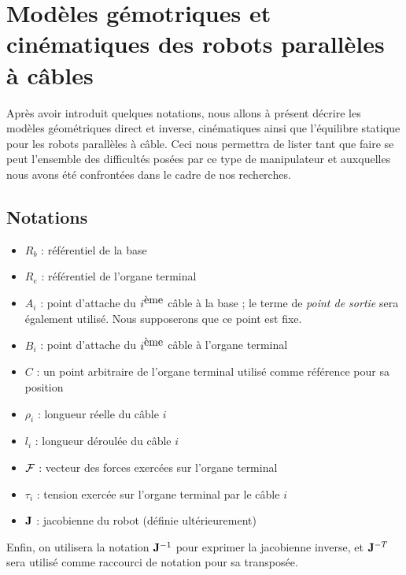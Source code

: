 \section{Mod\`eles g\'emotriques et cin\'ematiques des robots parall\`eles \`a 
c\^ables}

Après avoir introduit quelques notations, nous allons à présent décrire les 
modèles géométriques direct et inverse, cinématiques ainsi que l'équilibre 
statique pour les robots parallèles à câble. Ceci nous permettra de lister tant 
que faire se peut l'ensemble des difficultés posées par ce type de manipulateur 
et auxquelles nous avons été confrontées dans le cadre de nos recherches.

\subsection{Notations} \label{chap0-1-0}

\begin{figure}[!ht]
\centering
\def\svgwidth{.85\linewidth}

\end{figure}

\begin{itemize}
 \item $R_b$ : référentiel de la base
 \item $R_e$ : référentiel de l'organe terminal
 \item $A_i$ : point d'attache du $i^{\hbox{ème}}$ câble à la base ; le terme 
de {\it point de sortie} sera également utilisé. Nous supposerons que ce point 
est fixe.
 \item $B_i$ : point d'attache du $i^{\hbox{ème}}$ câble à l'organe terminal
 \item $C$ : un point arbitraire de l'organe terminal utilisé comme référence 
pour sa position
 \item $\rho_i$ : longueur réelle du câble $i$
 \item $l_i$ : longueur déroulée du câble $i$
 \item $\boldmath {\mathcal F}$ : vecteur des forces exercées sur l'organe 
terminal
  \item $\tau_i$ : tension exerc\'ee sur l'organe terminal par le c\^able $i$
 \item $\bf J$ : jacobienne du robot (d\'efinie ult\'erieurement)
\end{itemize}
Enfin, on utilisera la notation ${\bf J}^{-1}$ pour exprimer la jacobienne 
inverse, et ${\bf J}^{-T}$ sera utilisé comme raccourci de notation pour sa 
transposée.

